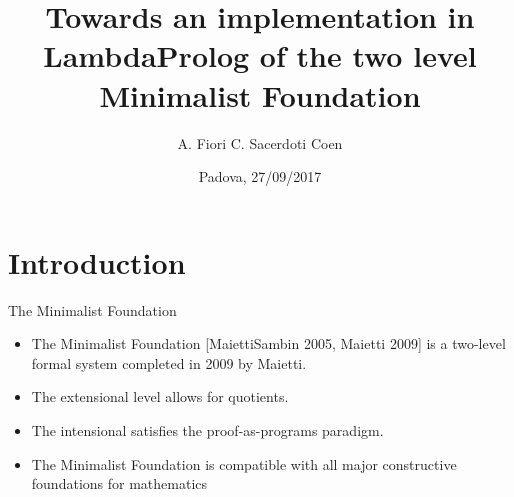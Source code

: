 \documentclass{beamer}
\title{Towards an implementation in LambdaProlog of the two level Minimalist Foundation}
\author{\hspace{1.7cm} A. Fiori \quad \quad C. Sacerdoti Coen}
\institute[University of Bologna]
{
  University of Padova \quad \quad
  University of Bologna
}
\date {Padova, 27/09/2017}
\begin{document}
\begin{frame}
  \titlepage
\end{frame}

\begin{frame}[fragile]
 \tableofcontents
\end{frame}


\section{Introduction}

	
\begin{frame}
	\begin{block}{The Minimalist Foundation}
	\begin{itemize}
			\item {The Minimalist Foundation [MaiettiSambin 2005, Maietti 2009] is a two-level formal system completed in 2009 by Maietti.}
			\item {The extensional level allows for quotients.} 
			\item {The intensional satisfies the proof-as-programs paradigm.}
			\item{The Minimalist Foundation is compatible with all major constructive foundations for mathematics}
		\end{itemize}
	\end{block}
\vspace{0.5em}

\end{frame}
\end{document}

